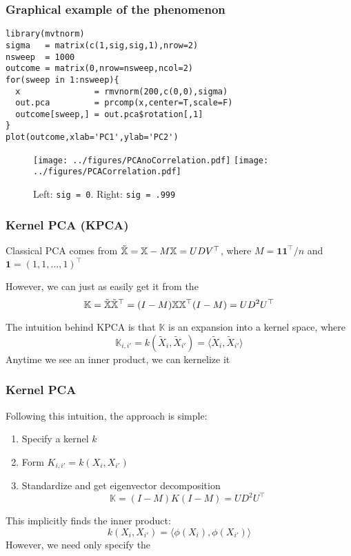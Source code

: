 \documentclass{beamer}
\begin{document}
\begin{frame}[fragile]
\frametitle{Graphical example of the phenomenon}
\scriptsize
\begin{verbatim}
library(mvtnorm)
sigma   = matrix(c(1,sig,sig,1),nrow=2)
nsweep  = 1000
outcome = matrix(0,nrow=nsweep,ncol=2)
for(sweep in 1:nsweep){
  x               = rmvnorm(200,c(0,0),sigma)
  out.pca         = prcomp(x,center=T,scale=F)
  outcome[sweep,] = out.pca$rotation[,1]
}
plot(outcome,xlab='PC1',ylab='PC2')
\end{verbatim}

\begin{figure}[h]
   \centering
   \texttt{[image: ../figures/PCAnoCorrelation.pdf]}
   \texttt{[image: ../figures/PCACorrelation.pdf]} 
   \caption{Left: {\tt sig = 0}. Right: {\tt sig = .999}}
\end{figure}
\end{frame}

\begin{frame}
\end{frame}
\begin{frame}[fragile]
  \frametitle{Kernel PCA (KPCA)}
Classical PCA comes from $\tilde{\mathbb{X}} = \mathbb{X} - M\mathbb{X} = UDV^{\top}$, where $M = \mathbf{1}\mathbf{1}^{\top}/n$ and $\mathbf{1} = (1,1,\ldots,1)^{\top}$

\vsp
However, we can just as easily get it from the 
\[
\mathbb{K} = \tilde{\mathbb{X}}\tilde{\mathbb{X}}^{\top} = (I - M)\mathbb{X}\mathbb{X}^{\top}(I - M) = UD^2U^{\top}
\]

\vsp
The intuition behind KPCA is that $\mathbb{K}$ is an expansion into a kernel space, where
\[
\mathbb{K}_{i,i'} = k( \tilde{X}_i,\tilde{X}_{i'}) = \langle \tilde{X}_i,\tilde{X}_{i'} \rangle
\]
 Anytime we see an inner product, we can kernelize it
\end{frame}

\begin{frame}[fragile]
  \frametitle{Kernel PCA}
Following this intuition, the approach is simple:
\begin{enumerate}
\item Specify a kernel $k$

\item Form $K_{i,i'} = k(X_i,X_{i'})$
\item Standardize and get eigenvector decomposition
\[
\mathbb{K} = (I - M)K(I - M) = UD^2U^{\top}
\]
\end{enumerate}

\vsp
This implicitly finds the inner product:
\[
k(X_i,X_{i'}) = \langle \phi(X_i),\phi(X_{i'})\rangle 
\]
However, we need only specify the 

\end{frame}
\end{document}
